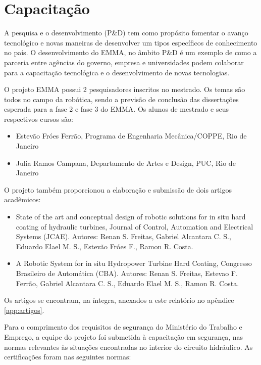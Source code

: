 \section{Capacitação}

A pesquisa e o desenvolvimento (P\&D) tem como propósito fomentar o avanço
tecnológico e novas maneiras de desenvolver um tipos específicos de conhecimento
no país. O desenvolvimento do EMMA, no âmbito P\&D é um exemplo de como a
parceria entre agências do governo, empresa e universidades podem colaborar para
a capacitação tecnológica e o desenvolvimento de novas tecnologias.

O projeto EMMA possui 2 pesquisadores inscritos no mestrado. Os temas são todos
no campo da robótica, sendo a previsão de conclusão das dissertações
esperada para a fase 2 e fase 3 do EMMA. Os alunos de mestrado e seus
respectivos cursos são:

\begin{itemize}
  \item Estevão Fróes Ferrão, Programa de Engenharia Mecânica/COPPE, Rio de
  Janeiro
  \item Julia Ramos Campana, Departamento de Artes e Design, PUC, Rio de Janeiro
\end{itemize}

O projeto também proporcionou a elaboração e submissão de dois artigos
acadêmicos:

\begin{itemize}
  \item State of the art and conceptual design of robotic solutions for in situ
  hard coating of hydraulic turbines, Journal of Control, Automation and
  Electrical Systems (JCAE). Autores: Renan S. Freitas, Gabriel Alcantara C. S.,
  Eduardo Elael M. S., Estevão Fróes F., Ramon R. Costa.
  \item A Robotic System for in situ Hydropower Turbine Hard Coating, Congresso
  Brasileiro de Automática (CBA). Autores: Renan S. Freitas, Estevao F. Ferrão,
  Gabriel Alcantara C. S., Eduardo Elael M. S., Ramon R. Costa.
\end{itemize}

Os artigos se encontram, na íntegra, anexados a este relatório no apêndice
\ref{app:artigos}.



Para o comprimento dos requisitos de segurança do Ministério do Trabalho e
Emprego, a equipe do projeto foi submetida à capacitação em segurança, nas
normas relevantes às situações encontradas no interior do circuito hidráulico. As certificações foram nas
seguintes normas:

